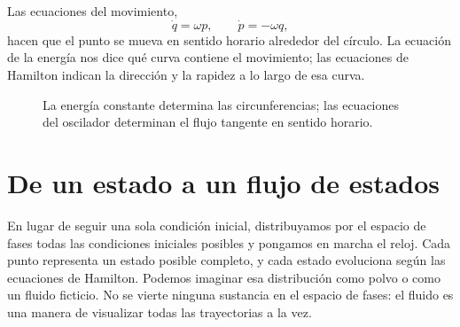 Las ecuaciones del movimiento,
\begin{equation}
  \dot q=\omega p,\qquad \dot p=-\omega q,
  \label{eq:l7-oscillator-flow}
\end{equation}
hacen que el punto se mueva en sentido horario alrededor del círculo. La ecuación de la energía nos dice qué curva contiene el movimiento; las ecuaciones de Hamilton indican la dirección y la rapidez a lo largo de esa curva.

\begin{figure}[htbp]
  \centering
  \caption{La energía constante determina las circunferencias; las ecuaciones del oscilador determinan el flujo tangente en sentido horario.}
\end{figure}

\begin{classroomqa}
\end{classroomqa}

\section{De un estado a un flujo de estados}

En lugar de seguir una sola condición inicial, distribuyamos por el espacio de fases todas las condiciones iniciales posibles y pongamos en marcha el reloj. Cada punto representa un estado posible completo, y cada estado evoluciona según las ecuaciones de Hamilton. Podemos imaginar esa distribución como polvo o como un fluido ficticio. No se vierte ninguna sustancia en el espacio de fases: el fluido es una manera de visualizar todas las trayectorias a la vez.

